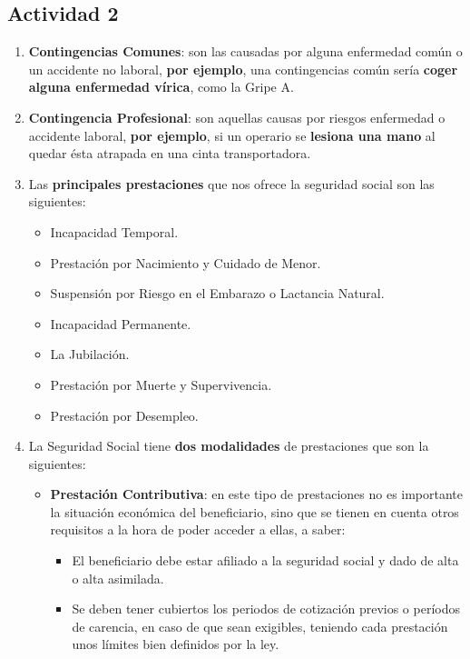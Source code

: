 \subsection{Actividad 2}

\begin{enumerate}[label=\alph*)]
    \item \textbf{Contingencias Comunes}: son las causadas por alguna enfermedad común o un accidente no laboral,  \textbf{por ejemplo}, una contingencias común sería \textbf{coger alguna enfermedad vírica}, como la Gripe A.

    \item \textbf{Contingencia Profesional}: son aquellas causas por riesgos enfermedad o accidente laboral, \textbf{por ejemplo}, si un operario se \textbf{lesiona una mano} al quedar ésta atrapada en una cinta transportadora.

    \item Las \textbf{principales prestaciones} que nos ofrece la seguridad social son las siguientes:
    \begin{itemize}
        \item Incapacidad Temporal.
        \item Prestación por Nacimiento y Cuidado de Menor.
        \item Suspensión por Riesgo en el Embarazo o Lactancia Natural.
        \item Incapacidad Permanente.
        \item La Jubilación.
        \item Prestación por Muerte y Supervivencia.
        \item Prestación por Desempleo.
    \end{itemize}

    \item La Seguridad Social tiene \textbf{dos modalidades} de prestaciones que son la siguientes:

    \begin{itemize}
        \item \textbf{Prestación Contributiva}: en este tipo de prestaciones no es importante la situación económica del beneficiario, sino que se tienen en cuenta otros requisitos a la hora de poder acceder a ellas, a saber:

        \begin{itemize}
            \item El beneficiario debe estar afiliado a la seguridad social y dado de alta o alta asimilada.
            \item Se deben tener cubiertos los periodos de cotización previos o períodos de carencia, en caso de que sean exigibles, teniendo cada prestación unos límites bien definidos por la ley.
        \end{itemize}


\end{itemize}
\end{enumerate}
